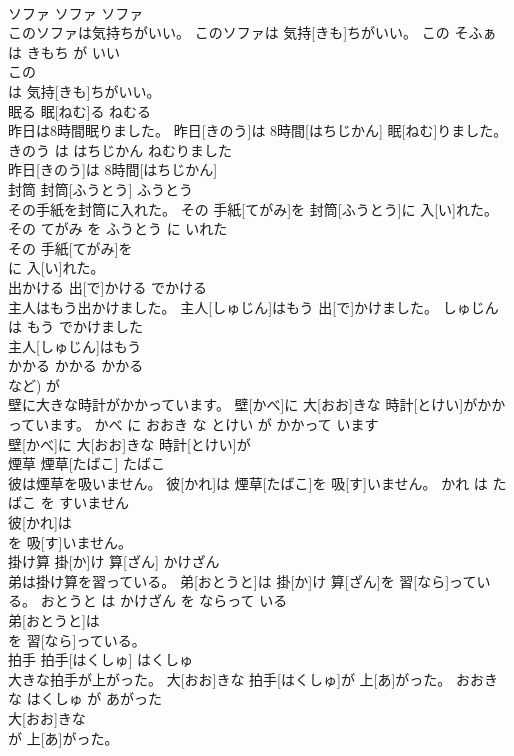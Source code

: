 \documentclass[8pt]{extreport}
\begin{document}
\begin{CJK}{UTF8}{min}
\\	ソファ	ソファ	ソファ	
\\	このソファは気持ちがいい。	このソファは 気持[きも]ちがいい。	この そふぁ は きもち が いい	
\\	この
\\	は 気持[きも]ちがいい。		
\\	眠る	眠[ねむ]る	ねむる	
\\	昨日は8時間眠りました。	昨日[きのう]は 8時間[はちじかん] 眠[ねむ]りました。	きのう は はちじかん ねむりました	
\\	昨日[きのう]は 8時間[はちじかん]
\\	封筒	封筒[ふうとう]	ふうとう	
\\	その手紙を封筒に入れた。	その 手紙[てがみ]を 封筒[ふうとう]に 入[い]れた。	その てがみ を ふうとう に いれた	
\\	その 手紙[てがみ]を
\\	に 入[い]れた。		
\\	出かける	出[で]かける	でかける	
\\	主人はもう出かけました。	主人[しゅじん]はもう 出[で]かけました。	しゅじん は もう でかけました	
\\	主人[しゅじん]はもう
\\	かかる	かかる	かかる	
\\	など) が		
\\	壁に大きな時計がかかっています。	壁[かべ]に 大[おお]きな 時計[とけい]がかかっています。	かべ に おおき な とけい が かかって います	
\\	壁[かべ]に 大[おお]きな 時計[とけい]が
\\	煙草	煙草[たばこ]	たばこ	
\\	彼は煙草を吸いません。	彼[かれ]は 煙草[たばこ]を 吸[す]いません。	かれ は たばこ を すいません	
\\	彼[かれ]は
\\	を 吸[す]いません。		
\\	掛け算	掛[か]け 算[ざん]	かけざん	
\\	弟は掛け算を習っている。	弟[おとうと]は 掛[か]け 算[ざん]を 習[なら]っている。	おとうと は かけざん を ならって いる	
\\	弟[おとうと]は
\\	を 習[なら]っている。		
\\	拍手	拍手[はくしゅ]	はくしゅ	
\\	大きな拍手が上がった。	大[おお]きな 拍手[はくしゅ]が 上[あ]がった。	おおき な はくしゅ が あがった	
\\	大[おお]きな
\\	が 上[あ]がった。		

\end{CJK}
\end{document}

